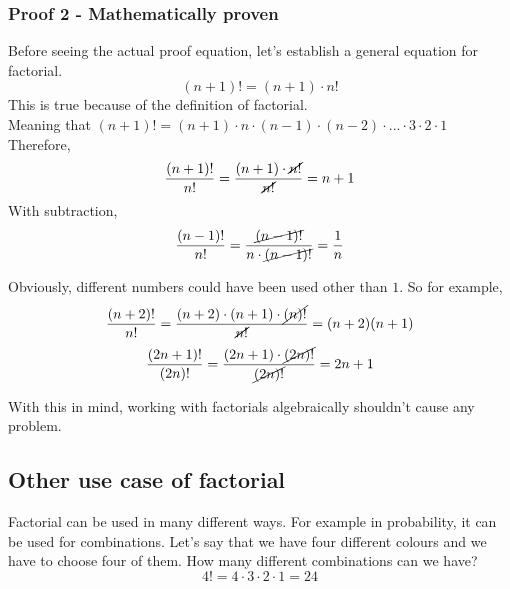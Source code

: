 \subsubsection{Proof 2 - Mathematically proven}
Before seeing the actual proof equation, let's establish a general equation for factorial.
$$ (n+1)! = (n+1) \cdot n! $$
This is true because of the definition of factorial. \\ Meaning that $ (n+1)! = (n+1) \cdot n \cdot (n-1) \cdot (n-2) \cdot ... \cdot 3 \cdot 2 \cdot 1 $ \\
Therefore, 
$$ \frac{(n+1)!}{n!} = \frac{(n+1) \cdot \cancel{n!}}{\cancel{n!}} = n+1 $$
With subtraction,
$$ \frac{(n-1)!}{n!} = \frac{\cancel{(n-1)!}}{n \cdot \cancel{(n-1)!}} = \frac{1}{n} $$

Obviously, different numbers could have been used other than $ 1 $. 
So for example,
$$ \frac{(n+2)!}{n!} = \frac{(n+2) \cdot (n+1) \cdot \cancel{(n)!} }{\cancel{n!}} = (n+2)(n+1) $$
$$ \frac{(2n + 1)!}{(2n)!}  = \frac{(2n + 1) \cdot \cancel{(2n)!}}{\cancel{(2n)!}} = 2n + 1 $$

With this in mind, working with factorials algebraically shouldn't cause any problem. 

\subsection{Other use case of factorial}
Factorial can be used in many different ways. For example in probability, it can be used for combinations. Let's say that we have four different colours and we have to choose four of them. How many different combinations can we have? 
$$ 4! = 4 \cdot 3 \cdot 2 \cdot 1 = 24$$